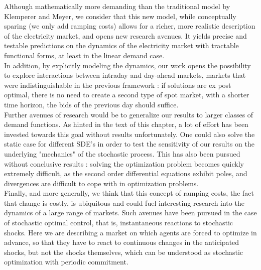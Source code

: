 Although mathematically more demanding than the traditional model by Klemperer and Meyer, we consider that this new model, while conceptually sparing (we only add ramping costs) allows for a richer, more realistic description of the electricity market, and opens new research avenues.  It yields precise and testable predictions on the dynamics of the electricity market with tractable functional forms, at least in the linear demand case. \\

In addition, by explicitly modeling the dynamics, our work opens the possibility to explore interactions between intraday and day-ahead markets, markets that were indistinguishable in the previous framework : if solutions are ex post optimal, there is no need to create a second type of spot market, with a shorter time horizon, the bids of the previous day should suffice. \\

Further avenues of research would be to generalize our results to larger classes of demand functions. As hinted in the text of this chapter, a lot of effort has been invested towards this goal without results unfortunately. One could also solve the static case for different SDE's in order to test the sensitivity of our results on the underlying "mechanics" of the stochastic process. This has also been pursued without conclusive results : solving the optimization problem becomes quickly extremely difficult, as the second order differential equations exhibit poles, and divergences are difficult to cope with in optimization problems.\\

Finally, and more generally, we think that this concept of ramping costs, the fact that change is costly, is ubiquitous and could fuel interesting research into the dynamics of a large range of markets. Such avenues have been pursued in the case of stochastic optimal control, that is, instantaneous reactions to stochastic shocks. Here we are describing a market on which agents are forced to optimize in advance, so that they have to react to continuous changes in the anticipated shocks, but not the shocks themselves, which can be understood as stochastic optimization with periodic commitment. 

